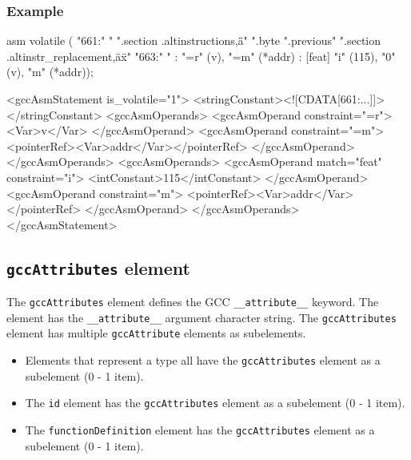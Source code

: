 {\subsubsection*{Example}
\vspace{2mm}

\begin{CExample}
  asm volatile (
       "661:\n"
       "\tmovl %
       ".section .altinstructions,\"a\"\n"
       ".byte %
       ".previous\n"
       ".section .altinstr_replacement,\"ax\"\n"
       "663:\n"
       "\txchgl %
       : "=r" (v), "=m" (*addr)
       : [feat] "i" (115), "0" (v), "m" (*addr));
\end{CExample}
\vspace{1mm}

\begin{XcodeMLExample}
   <gccAsmStatement is_volatile="1">
     <stringConstant><![CDATA[661:\n\tmovl ...]]></stringConstant>
     <gccAsmOperands>
       <gccAsmOperand constraint="=r">
         <Var>v</Var>
       </gccAsmOperand>
       <gccAsmOperand constraint="=m">
         <pointerRef><Var>addr</Var></pointerRef>
       </gccAsmOperand>
     </gccAsmOperands>
     <gccAsmOperands>
       <gccAsmOperand match="feat" constraint="i">
         <intConstant>115</intConstant>
       </gccAsmOperand>
       <gccAsmOperand constraint="m">
         <pointerRef><Var>addr</Var></pointerRef>
       </gccAsmOperand>
     </gccAsmOperands>
   </gccAsmStatement>
\end{XcodeMLExample}


\subsection{ {\tt gccAttributes} element}

The {\tt gccAttributes} element defines the GCC {\tt \_\_attribute\_\_} keyword. The element has the {\tt \_\_attribute\_\_} argument character string. The {\tt gccAttributes} element has multiple {\tt gccAttribute} elements as subelements.

\begin{itemize}
\item Elements that represent a type all have the {\tt gccAttributes} element as a subelement (0 - 1 item).
\item The {\tt id} element has the {\tt gccAttributes} element as a subelement (0 - 1 item).
\item The {\tt functionDefinition} element has the {\tt gccAttributes} element as a subelement (0 - 1 item).
\end{itemize}

}
